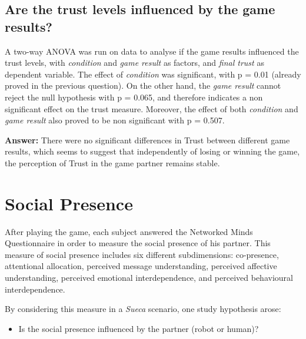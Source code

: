 \subsection*{Are the trust levels influenced by the game results?}
A two-way ANOVA was run on data to analyse if the game results influenced the trust levels, with \emph{condition} and \emph{game result} as factors, and \emph{final trust} as dependent variable.
The effect of \emph{condition} was significant, with p = 0.01 (already proved in the previous question).
On the other hand, the \emph{game result} cannot reject the null hypothesis with p = 0.065, and therefore indicates a non significant effect on the trust measure.
Moreover, the effect of both \emph{condition} and \emph{game result} also proved to be non significant with p = 0.507.

\textbf{Answer:} There were no significant differences in Trust between different game results, which seems to suggest that independently of losing or winning the game, the perception of Trust in the game partner remains stable.


\section{Social Presence}
\label{sec:socialPresence}
After playing the game, each subject answered the Networked Minds Questionnaire in order to measure the social presence of his partner.
This measure of social presence includes six different subdimensions: co-presence, attentional allocation, perceived message understanding, perceived affective understanding, perceived emotional interdependence, and perceived behavioural interdependence.

By considering this measure in a \emph{Sueca} scenario, one study hypothesis arose:
\begin{itemize}
\item Is the social presence influenced by the partner (robot or human)?
\end{itemize}


